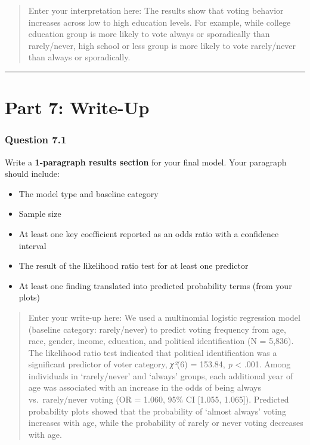 \documentclass[
  letterpaper,
  DIV=11,
  numbers=noendperiod]{scrartcl}
\providecommand{\tightlist}{%
  \setlength{\itemsep}{0pt}\setlength{\parskip}{0pt}}
\begin{document}
\begin{quote}
Enter your interpretation here: The results show that voting behavior
increases across low to high education levels. For example, while
college education group is more likely to vote always or sporadically
than rarely/never, high school or less group is more likely to vote
rarely/never than always or sporadically.
\end{quote}

\begin{center}\rule{0.5\linewidth}{0.5pt}\end{center}

\section{Part 7: Write-Up}\label{part-7-write-up}

\subsubsection*{Question 7.1}\label{question-7.1}

Write a \textbf{1-paragraph results section} for your final model. Your
paragraph should include:

\begin{itemize}
\tightlist
\item
  The model type and baseline category
\item
  Sample size
\item
  At least one key coefficient reported as an odds ratio with a
  confidence interval
\item
  The result of the likelihood ratio test for at least one predictor
\item
  At least one finding translated into predicted probability terms (from
  your plots)
\end{itemize}

\begin{quote}
Enter your write-up here: We used a multinomial logistic regression
model (baseline category: rarely/never) to predict voting frequency from
age, race, gender, income, education, and political identification (N =
5,836). The likelihood ratio test indicated that political
identification was a significant predictor of voter category,
\emph{χ²}(6) = 153.84, \emph{p} \textless{} .001. Among individuals in
`rarely/never' and `always' groups, each additional year of age was
associated with an increase in the odds of being always vs.~rarely/never
voting (OR = 1.060, 95\% CI {[}1.055, 1.065{]}). Predicted probability
plots showed that the probability of `almost always' voting increases
with age, while the probability of rarely or never voting decreases with
age.
\end{quote}
\end{document}
